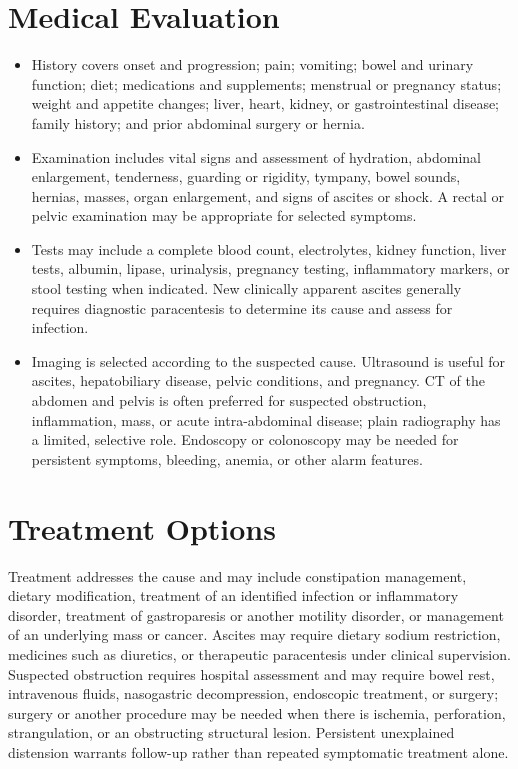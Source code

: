 \section*{Medical Evaluation}
\begin{itemize}
  \item History covers onset and progression; pain; vomiting; bowel and urinary function; diet; medications and supplements; menstrual or pregnancy status; weight and appetite changes; liver, heart, kidney, or gastrointestinal disease; family history; and prior abdominal surgery or hernia.
  \item Examination includes vital signs and assessment of hydration, abdominal enlargement, tenderness, guarding or rigidity, tympany, bowel sounds, hernias, masses, organ enlargement, and signs of ascites or shock. A rectal or pelvic examination may be appropriate for selected symptoms.
  \item Tests may include a complete blood count, electrolytes, kidney function, liver tests, albumin, lipase, urinalysis, pregnancy testing, inflammatory markers, or stool testing when indicated. New clinically apparent ascites generally requires diagnostic paracentesis to determine its cause and assess for infection.
  \item Imaging is selected according to the suspected cause. Ultrasound is useful for ascites, hepatobiliary disease, pelvic conditions, and pregnancy. CT of the abdomen and pelvis is often preferred for suspected obstruction, inflammation, mass, or acute intra-abdominal disease; plain radiography has a limited, selective role. Endoscopy or colonoscopy may be needed for persistent symptoms, bleeding, anemia, or other alarm features.
\end{itemize}

\section*{Treatment Options}
Treatment addresses the cause and may include constipation management, dietary modification, treatment of an identified infection or inflammatory disorder, treatment of gastroparesis or another motility disorder, or management of an underlying mass or cancer. Ascites may require dietary sodium restriction, medicines such as diuretics, or therapeutic paracentesis under clinical supervision. Suspected obstruction requires hospital assessment and may require bowel rest, intravenous fluids, nasogastric decompression, endoscopic treatment, or surgery; surgery or another procedure may be needed when there is ischemia, perforation, strangulation, or an obstructing structural lesion. Persistent unexplained distension warrants follow-up rather than repeated symptomatic treatment alone.

